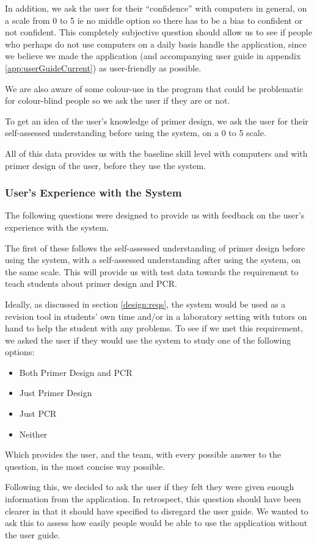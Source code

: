 In addition, we ask the user for their ``confidence'' with computers
in general, on a scale from 0 to 5 ie no middle option so there has
to be a bias to confident or not confident.
This completely subjective question should allow us to see if people
who perhaps do not use computers on a daily basis handle the
application, since we believe we made the application (and
accompanying user guide in appendix \ref{app:userGuideCurrent}) as
user-friendly as possible.

We are also aware of some colour-use in the program that could be
problematic for colour-blind people so we ask the user if they are or
not.

To get an idea of the user's knowledge of primer design, we ask the
user for their self-assessed understanding before using the system, on
a 0 to 5 scale.

All of this data provides us with the baseline skill level with
computers and with primer design of the user, before they use the
system.

\subsubsection{User's Experience with the System}
The following questions were designed to provide us with feedback on
the user's experience with the system.

The first of these follows the self-assessed understanding of primer
design before using the system, with a self-assessed understanding
after using the system, on the same scale.
This will provide us with test data towards the requirement to teach
students about primer design and PCR.

Ideally, as discussed in section \ref{design:reqs}, the system would
be used as a revision tool in students' own time and/or in a
laboratory setting with tutors on hand to help the student with any
problems.
To see if we met this requirement, we asked the user if they would use
the system to study one of the following options:
\begin{itemize}
\item Both Primer Design and PCR
\item Just Primer Design
\item Just PCR
\item Neither
\end{itemize}
Which provides the user, and the team, with every possible answer to
the question, in the most concise way possible.

Following this, we decided to ask the user if they felt they were
given enough information from the application.
In retrospect, this question should have been clearer in that it
should have specified to disregard the user guide.
We wanted to ask this to assess how easily people would be able to use
the application without the user guide.

